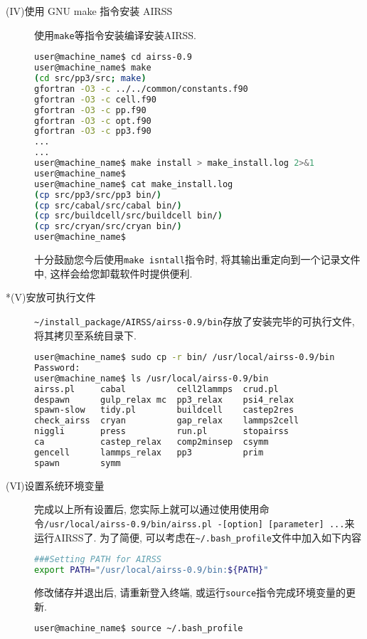 \documentclass[a4paper, 10pt]{article}
\begin{document}
\begin{description}
\item[(IV)使用 GNU make 指令安装 AIRSS] 使用\verb|make|等指令安装编译安装AIRSS.
\begin{lstlisting}[language={bash}]
user@machine_name$ cd airss-0.9
user@machine_name$ make
(cd src/pp3/src; make)
gfortran -O3 -c ../../common/constants.f90
gfortran -O3 -c cell.f90
gfortran -O3 -c pp.f90
gfortran -O3 -c opt.f90
gfortran -O3 -c pp3.f90
...
...
user@machine_name$ make install > make_install.log 2>&1
user@machine_name$
user@machine_name$ cat make_install.log
(cp src/pp3/src/pp3 bin/)
(cp src/cabal/src/cabal bin/)
(cp src/buildcell/src/buildcell bin/)
(cp src/cryan/src/cryan bin/)
user@machine_name$
\end{lstlisting}

十分鼓励您今后使用\verb|make isntall|指令时, 将其输出重定向到一个记录文件中, 这样会给您卸载软件时提供便利.

\item[*(V)安放可执行文件] \verb|~/install_package/AIRSS/airss-0.9/bin|存放了安装完毕的可执行文件, 将其拷贝至系统目录下.
\begin{lstlisting}[language={bash}]
user@machine_name$ sudo cp -r bin/ /usr/local/airss-0.9/bin
Password:
user@machine_name$ ls /usr/local/airss-0.9/bin
airss.pl     cabal          cell2lammps  crud.pl      
despawn      gulp_relax mc  pp3_relax    psi4_relax   
spawn-slow   tidy.pl        buildcell    castep2res   
check_airss  cryan          gap_relax    lammps2cell  
niggli       press          run.pl       stopairss    
ca           castep_relax   comp2minsep  csymm        
gencell      lammps_relax   pp3          prim         
spawn        symm

\end{lstlisting}

\item[(VI)设置系统环境变量] 完成以上所有设置后, 您实际上就可以通过使用使用命令\verb|/usr/local/airss-0.9/bin/airss.pl -[option] [parameter] ...|来运行AIRSS了. 为了简便, 可以考虑在\verb|~/.bash_profile|文件中加入如下内容
\begin{lstlisting}[language={bash}]
###Setting PATH for AIRSS
export PATH="/usr/local/airss-0.9/bin:${PATH}"
\end{lstlisting}

修改储存并退出后, 请重新登入终端, 或运行\verb|source|指令完成环境变量的更新.
\begin{lstlisting}[language={bash}]
user@machine_name$ source ~/.bash_profile 
\end{lstlisting}


\end{description}
\end{document}
